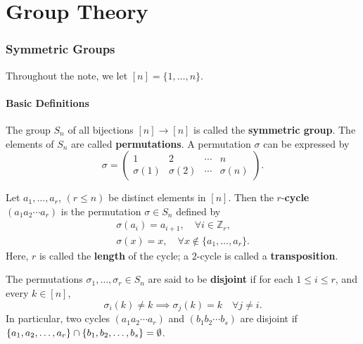 \part{Group Theory}
\section{Symmetric Groups} \label{sec-symmetric-groups}
Throughout the note, we let $[n] = \{1,\dots, n\}$.
\subsection{Basic Definitions}
\begin{definition}
	The group $S_n$ of all bijections $[n]\rightarrow [n]$ is called the \textbf{symmetric group}. The elements of $S_n$ are called \textbf{permutations}. A permutation $\sigma$ can be expressed by
	\begin{equation*}
		\sigma = \begin{pmatrix}
			1 & 2 & \cdots & n\\
			\sigma(1) &  \sigma(2) & \cdots & \sigma(n)
		\end{pmatrix}.
	\end{equation*}
\end{definition}
\begin{definition}
	Let $a_1,\dots, a_r$, $(r\leq n)$ be distinct elements in $[n]$. Then the $r$-\textbf{cycle} $(a_1a_2\cdots a_r)$ is the permutation $\sigma\in S_n$ defined by
	\begin{gather*}
		\sigma(a_i) = a_{i+1},\quad \forall i\in\mathbb{Z}_r,
		\\
		\sigma(x) = x,\quad \forall x\not\in\{a_1,\dots, a_r\}.
	\end{gather*} 
	Here, $r$ is called the \textbf{length} of the cycle; a $2$-cycle is called a \textbf{transposition}.
\end{definition}
\begin{definition}
	The permutations $\sigma_1,\dots, \sigma_r\in S_n$ are said to be \textbf{disjoint} if for each $1\leq i\leq r$, and every $k\in[n]$, 
	\begin{equation*}
		\sigma_i(k)\neq k\implies \sigma_j(k)=k\quad \forall j\neq i.
	\end{equation*}
	In particular, two cycles $(a_1a_2\cdots a_r)$ and $(b_1b_2\cdots b_s)$ are disjoint if $\{a_1,a_2,\dots, a_r\}\cap \{b_1,b_2,\break\dots ,b_s\} = \emptyset$.
\end{definition}

